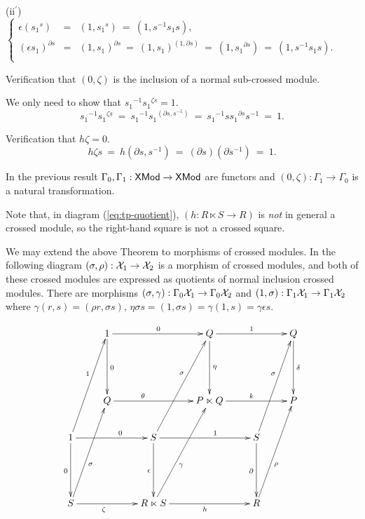 \begin{pf}
\bigskip
(ii$^{\prime}$)~ 
$\left\{ 
\begin{array}{rcl}
\epsilon({s_1}^s) & = & 
(1,{s_1}^s) ~=~ (1,s^{-1}s_1s), \\
(\epsilon s_1)^{\partial s} & = &
(1,s_1)^{\partial s} ~=~ 
(1,s_1)^{(1, \partial s)} ~=~ (1,{s_1}^{\partial s})~=~
(1, s^{-1}s_1s). \\
\end{array}\right.$

\bigskip\noindent
Verification that $(0,\zeta)$ is the inclusion of a normal sub-crossed module.

\bigskip\noindent
We only need to show that ${s_1}^{-1} {s_1}^{\zeta s} = 1$.
$$
{s_1}^{-1} {s_1}^{\zeta s} ~=~
{s_1}^{-1} {s_1}^{(\partial s, s^{-1})} ~=~
{s_1}^{-1} s {s_1}^{\partial s} s^{-1} ~=~ 1.
$$

\bigskip\noindent
Verification that $h\zeta = 0$.
$$
h \zeta s ~=~ h(\partial s, s^{-1}) ~=~ (\partial s)(\partial s^{-1}) ~=~ 1.
$$
\end{pf}

\begin{cor}
In the previous result $\Gamma_0, \Gamma_1 : {{\sf XMod}} \to {{\sf XMod}}$ are functors
and $(0,\zeta) : \Gamma_1 \to \Gamma_0$ is a natural transformation.
\end{cor}

Note that, in diagram (\ref{eq:tp-quotient}),  
$(h : R \ltimes S \to R)$ is \emph{not} in general a crossed module,
so the right-hand square is not a crossed square.

\newpage
We may extend the above Theorem to morphisms of crossed modules. 
In the following diagram $(\sigma,\rho) : \mathcal{X}_1 \to \mathcal{X}_2$ 
is a morphism of crossed modules, 
and both of these crossed modules are expressed as quotients of 
normal inclusion crossed modules. 
There are morphisms $(\sigma,\gamma) : \Gamma_0\mathcal{X}_1 \to \Gamma_0\mathcal{X}_2$ 
and $(1,\sigma) : \Gamma_1\mathcal{X}_1 \to \Gamma_1\mathcal{X}_2$ 
where $\gamma(r,s) = (\rho r, \sigma s)$, 
$\eta\sigma s = (1,\sigma s) = \gamma(1,s) = \gamma\epsilon s$. 

\begin{equation} \label{eq:tp-quotient-morphism}
\vcenter{\xy
\xymatrix{
     & 1 \ar[dd]^{0} \ar[rr]^0
         &   & Q \ar[rr]^{1} \ar[dd]^{\eta} 
                 &   & Q \ar[dd]^{\delta}  \\
     &   &   &   &   & \\ 
     & Q \ar[rr]^(0.35){\theta} 
         &   & P \ltimes Q \ar[rr]^{k} 
                 &   & P  \\ 
  1 \ar[dd]_{0} \ar[rr]^(0.6){0} \ar[ruuu]^(0.6){1} 
     &   & S \ar[rr]^(0.6){1} \ar[dd]_{\epsilon} \ar[ruuu]^(0.6){\sigma}  
             &   & S \ar[dd]_{\partial} \ar[ruuu]^(0.6){\sigma} 
                     & \\
     &   &   &   &   & \\
  S \ar[rr]_(0.4){\zeta} \ar[ruuu]_(0.4){\sigma} 
     &   & R \ltimes S \ar[rr]_{h} \ar[ruuu]_(0.4){\gamma} 
             &   & R \ar[ruuu]_(0.4){\rho} 
                     & \\
}
\endxy} 
\end{equation}


